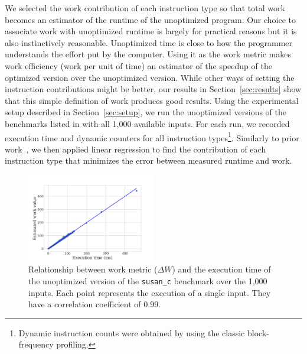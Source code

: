     We selected the work contribution of each instruction type so that total work becomes an estimator of the runtime of the unoptimized
    program.
    Our choice to associate work with unoptimized runtime is largely for practical reasons but it is also instinctively reasonable.
    Unoptimized time is
    close to how the programmer understands the effort put by the computer. Using it as the work metric makes work efficiency (work per unit
    of time) an estimator of the speedup of the optimized version over the unoptimized version. While other ways of setting the instruction
    contributions might be better, our results in Section~\ref{sec:results} show that this simple definition of work produces good results.
    Using the experimental setup described in Section~\ref{sec:setup}, we run the unoptimized versions of the  benchmarks listed
    in  with all 1,000 available inputs. For each run, we recorded execution time and dynamic counters for all instruction types\footnote{
    Dynamic instruction counts were obtained by using the classic block-frequency profiling.}.
    Similarly to prior work~\cite{giusto01,powell09,brandolese11}, we then applied linear regression to find the contribution of each
    instruction type that minimizes the error between measured runtime and work.

    \begin{figure}[t]
        \centering
        \includegraphics[width=0.5\textwidth]{figs/work-correlation-with-O0_susan_c.pdf}
        \caption{
            Relationship between work metric ($\Delta W$) and the execution time of the unoptimized version of the \texttt{susan\_c}
            benchmark over the 1,000 inputs. Each point represents the execution of a single input. They have a correlation coefficient of
            $0.99$.
        }
        \label{fig:work-vs-O0time}
    \end{figure}
    
